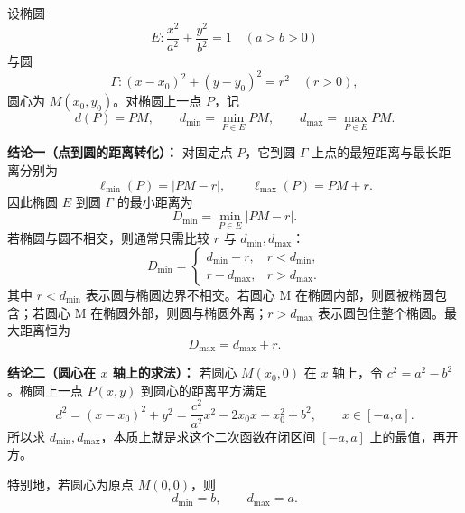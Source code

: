 \begin{statementbox}
设椭圆
\[
E:\frac{x^2}{a^2}+\frac{y^2}{b^2}=1\quad (a>b>0)
\]
与圆
\[
\Gamma:(x-x_0)^2+(y-y_0)^2=r^2\quad (r>0),
\]
圆心为 $M(x_0,y_0)$。对椭圆上一点 $P$，记
\[
d(P)=PM,
\qquad
 d_{\min}=\min_{P\in E} PM,
\qquad
 d_{\max}=\max_{P\in E} PM.
\]

\textbf{结论一（点到圆的距离转化）：}
对固定点 $P$，它到圆 $\Gamma$ 上点的最短距离与最长距离分别为
\[
\ell_{\min}(P)=|PM-r|,
\qquad
\ell_{\max}(P)=PM+r.
\]
因此椭圆 $E$ 到圆 $\Gamma$ 的最小距离为
\[
D_{\min}=\min_{P\in E}|PM-r|.
\]
若椭圆与圆不相交，则通常只需比较 $r$ 与 $d_{\min},d_{\max}$：
\[
D_{\min}= 
\begin{cases}
 d_{\min}-r, & r<d_{\min},\\[2mm]
 r-d_{\max}, & r>d_{\max}.
\end{cases}
\]
其中 $r<d_{\min}$ 表示圆与椭圆边界不相交。若圆心 M 在椭圆内部，则圆被椭圆包含；若圆心 M 在椭圆外部，则圆与椭圆外离；$r>d_{\max}$ 表示圆包住整个椭圆。最大距离恒为
\[
D_{\max}=d_{\max}+r.
\]





\textbf{结论二（圆心在 $x$ 轴上的求法）：}
若圆心 $M(x_0,0)$ 在 $x$ 轴上，令 $c^2=a^2-b^2$。椭圆上一点 $P(x,y)$ 到圆心的距离平方满足
\[
d^2=(x-x_0)^2+y^2
=\frac{c^2}{a^2}x^2-2x_0x+x_0^2+b^2,
\qquad x\in[-a,a].
\]
所以求 $d_{\min},d_{\max}$，本质上就是求这个二次函数在闭区间 $[-a,a]$ 上的最值，再开方。

特别地，若圆心为原点 $M(0,0)$，则
\[
d_{\min}=b,
\qquad
 d_{\max}=a.
\]
\end{statementbox}
